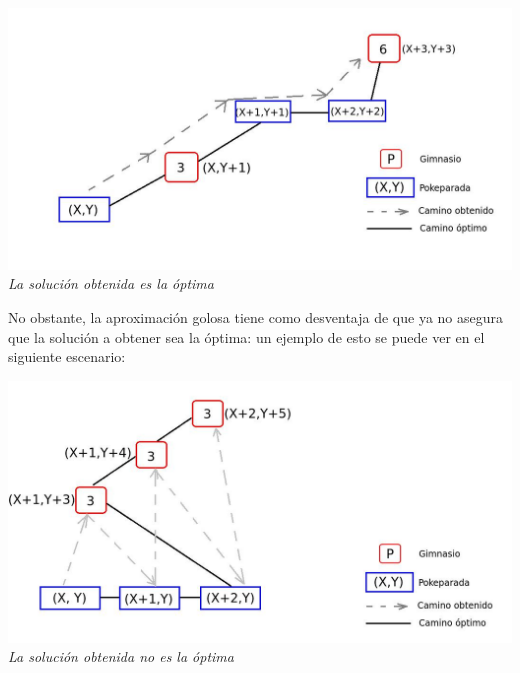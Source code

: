 \vspace*{0.3cm} \vspace*{0.3cm}
  \begin{center}
\includegraphics[scale=0.60]{./EJ2/optima.jpeg}
\\{\textit{La soluci\'on obtenida es la \'optima}}
  \end{center}
  \vspace*{0.3cm}

No obstante, la aproximación golosa tiene como desventaja de que ya no asegura que la solución a obtener sea la óptima: un ejemplo de esto se puede ver en el siguiente escenario:

\vspace*{0.3cm} \vspace*{0.3cm}
  \begin{center}
\includegraphics[scale=0.60]{./EJ2/nooptima.jpeg}
\\{\textit{La soluci\'on obtenida no es la \'optima}}
  \end{center}
  \vspace*{0.3cm}